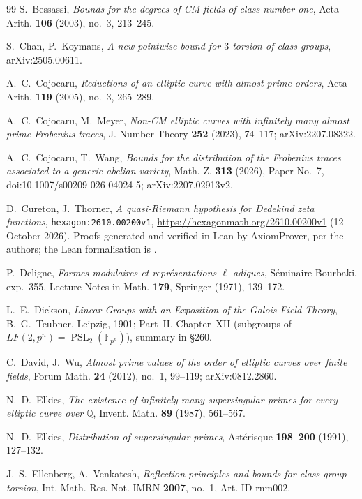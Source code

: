 \documentclass[11pt]{amsart}
\theoremstyle{definition}
\theoremstyle{remark}
\newcommand{\Q}{\mathbb{Q}}
\newcommand{\F}{\mathbb{F}}
\DeclareMathOperator{\PSL}{PSL}
\begin{document}
\begin{thebibliography}{99}
S.~Bessassi, \emph{Bounds for the degrees of CM-fields of class number one}, Acta Arith. \textbf{106} (2003), no.~3,
213--245.

S.~Chan, P.~Koymans, \emph{A new pointwise bound for $3$-torsion of class groups}, arXiv:2505.00611.

A.~C.~Cojocaru, \emph{Reductions of an elliptic curve with almost prime orders}, Acta Arith. \textbf{119} (2005),
no.~3, 265--289.

A.~C.~Cojocaru, M.~Meyer, \emph{Non-CM elliptic curves with infinitely many almost prime Frobenius traces},
J. Number Theory \textbf{252} (2023), 74--117; arXiv:2207.08322.

A.~C.~Cojocaru, T.~Wang, \emph{Bounds for the distribution of the Frobenius traces associated to a generic abelian
variety}, Math. Z. \textbf{313} (2026), Paper No.~7, doi:10.1007/s00209-026-04024-5; arXiv:2207.02913v2.

D.~Cureton, J.~Thorner, \emph{A quasi-Riemann hypothesis for Dedekind zeta functions}, \texttt{hexagon:2610.00200v1},
\url{https://hexagonmath.org/2610.00200v1} (12 October 2026). Proofs generated and verified in Lean by AxiomProver,
per the authors; the Lean formalisation is \cite{CT-Lean}.

P.~Deligne, \emph{Formes modulaires et repr\'esentations $\ell$-adiques}, S\'eminaire Bourbaki, exp.~355, Lecture
Notes in Math. \textbf{179}, Springer (1971), 139--172.

L.~E.~Dickson, \emph{Linear Groups with an Exposition of the Galois Field Theory}, B.~G.~Teubner, Leipzig, 1901;
Part~II, Chapter~XII (subgroups of $LF(2,p^n)=\PSL_2(\F_{p^n})$), summary in \S260.

C.~David, J.~Wu, \emph{Almost prime values of the order of elliptic curves over finite fields}, Forum Math.
\textbf{24} (2012), no.~1, 99--119; arXiv:0812.2860.

N.~D.~Elkies, \emph{The existence of infinitely many supersingular primes for every elliptic curve over $\Q$}, Invent.
Math. \textbf{89} (1987), 561--567.

N.~D.~Elkies, \emph{Distribution of supersingular primes}, Ast\'erisque \textbf{198--200} (1991), 127--132.

J.~S.~Ellenberg, A.~Venkatesh, \emph{Reflection principles and bounds for class group torsion}, Int. Math. Res. Not.
IMRN \textbf{2007}, no.~1, Art. ID rnm002.


\end{thebibliography}
\end{document}
